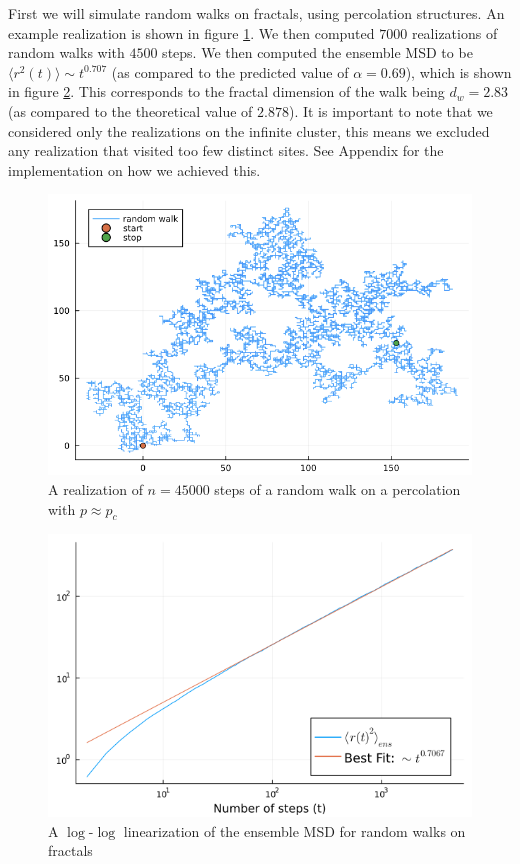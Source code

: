 \documentclass[%
 reprint,
 amsmath,amssymb,
 aps,
]{revtex4-2}
\begin{document}
First we will simulate random walks on fractals, using percolation structures. An example realization is shown in figure \ref{fig:perc_real}. We then computed $7000$ realizations of random walks with $4500$ steps. We then computed the ensemble MSD to be $\langle r^2(t)\rangle\sim t^{0.707}$ (as compared to the predicted value of $\alpha=0.69$), which is shown in figure \ref{fig:linmsd_frac}. This corresponds to the fractal dimension of the walk being $d_w=2.83$ (as compared to the theoretical value of $2.878$). It is important to note that we considered only the realizations on the infinite cluster, this means we excluded any realization that visited too few distinct sites. See Appendix for the implementation on how we achieved this.

\begin{figure}
    \centering
    \includegraphics[scale=.49]{frac_realization_n10000.png}
    \caption{A realization of $n=45000$ steps of a random walk on a percolation with $p\approx p_c$}
    \label{fig:perc_real}
\end{figure}

\begin{figure}
    \centering
    \includegraphics[scale=.36]{lin_ens_msd_frac.png}
    \caption{A $\log$-$\log$ linearization of the ensemble MSD for random walks on fractals}
    \label{fig:linmsd_frac}
\end{figure}
\end{document}

